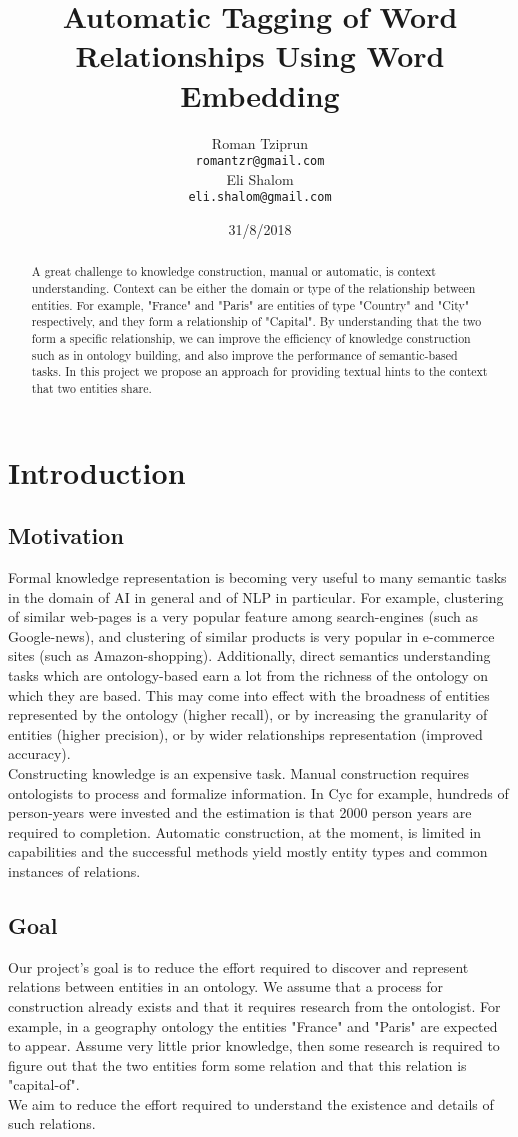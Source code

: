 \documentclass[11pt,a4paper]{article}
\title{Automatic Tagging of Word Relationships Using Word Embedding}
\author{Roman Tziprun \\
  {\tt romantzr@gmail.com} \\\And
  Eli Shalom \\
  {\tt eli.shalom@gmail.com} \\}
\date{31/8/2018}
\begin{document}
\maketitle
\begin{abstract}
  A great challenge to knowledge construction, manual or automatic, is context understanding. Context can be either the domain or type of the relationship between entities. For example, "France" and "Paris" are entities of type "Country" and "City" respectively,  and they form a relationship of "Capital". By understanding that the two form a specific relationship, we can improve the efficiency of knowledge construction such as in ontology building, and also improve the performance of semantic-based tasks. In this project we propose an approach for providing textual hints to the context that two entities share.
\end{abstract}
\section{Introduction}
\subsection{Motivation}
Formal knowledge representation is becoming very useful to many semantic tasks in the domain of AI in general and of NLP in particular. For example, clustering of similar web-pages is a very popular feature among search-engines (such as Google-news), and clustering of similar products is very popular in e-commerce sites (such as Amazon-shopping). Additionally, direct semantics understanding tasks which are ontology-based earn a lot from the richness of the ontology on which they are based. This may come into effect with the broadness of entities represented by the ontology (higher recall), or by increasing the granularity of entities (higher precision), or by wider relationships representation (improved accuracy).\\
Constructing knowledge is an expensive task. Manual construction requires ontologists to process and formalize information. In Cyc for example, hundreds of person-years were invested and the estimation is that 2000 person years are required to completion. Automatic construction, at the moment, is limited in capabilities and  the successful methods yield mostly entity types and common instances of relations.
\subsection{Goal}
Our project's goal is to reduce the effort required to discover and represent relations between entities in an ontology. We assume that a process for construction already exists and that it requires research from the ontologist. For example, in a geography ontology the entities "France" and "Paris" are expected to appear. Assume very little prior knowledge, then some research is required to figure out that the two entities form some relation and that this relation is "capital-of".\\
We aim to reduce the effort required to understand the existence and details of such relations.
\end{document}
